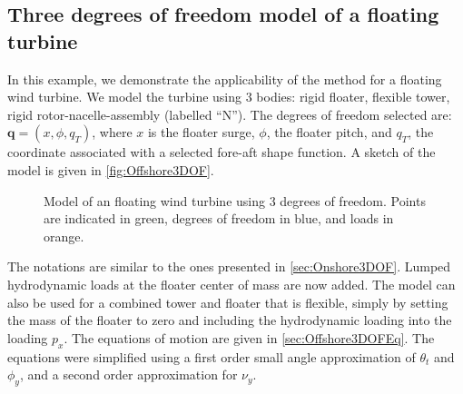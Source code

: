 \documentclass[wes, manuscript]{copernicus}
\renewcommand{\v}[1]{\boldsymbol{#1}}
\begin{document}
\subsection{Three degrees of freedom model of a floating turbine}
\label{sec:Offshore3DOF}
In this example, we demonstrate the applicability of the method for a floating wind turbine.
We model the turbine using 3 bodies: rigid floater, flexible tower, rigid rotor-nacelle-assembly (labelled ``N''). The degrees of freedom selected are: $\v{q}=(x,\phi,q_T)$, where $x$ is the floater surge, $\phi$, the floater pitch, and $q_T$, the coordinate associated with a selected fore-aft shape function. 
A sketch of the model is given in \autoref{fig:Offshore3DOF}. 
\begin{figure}[!htb]%
 \centering%
 \def\svgwidth{0.6\columnwidth}%
 \caption{Model of an floating wind turbine using 3 degrees of freedom. Points are indicated in green, degrees of freedom in blue, and loads in orange.}\label{fig:Offshore3DOF}%
 \end{figure}%
The notations are similar to the ones presented in \autoref{sec:Onshore3DOF}. Lumped hydrodynamic loads at the floater center of mass are now added. The model can also be used for a combined tower and floater that is flexible, simply by setting the mass of the floater to zero and including the hydrodynamic loading into the loading $p_x$.
The equations of motion are given in \autoref{sec:Offshore3DOFEq}.
The equations were simplified using a first order small angle approximation of $\theta_t$ and $\phi_y$, and a second order approximation for $\nu_y$.
\end{document}
